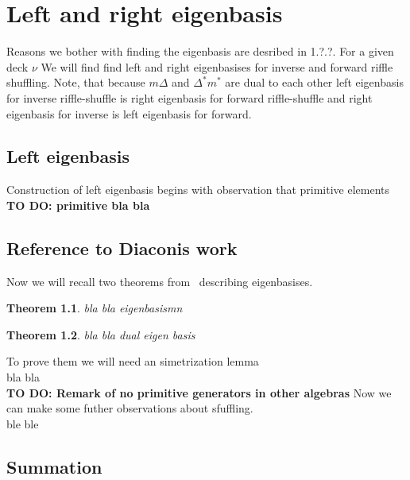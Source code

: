 \documentclass[a4paper, 12pt]{report}
\newtheorem{theorem}{Theorem}
\newcommand{\todo}[1]{\hfill \break \textbf{\Huge TO DO: #1 \hfill \break}\normalsize}
\begin{document}
\chapter{Left and right eigenbasis}

Reasons we bother with finding the eigenbasis are desribed in 1.?.?. For a given deck $\nu$ 
We will find find left and right eigenbasises for inverse and forward riffle shuffling. Note, that because 
$m\Delta$ and $\Delta^*m^*$ are dual to each other left eigenbasis for inverse riffle-shuffle is right 
eigenbasis for forward riffle-shuffle and right eigenbasis for inverse is left eigenbasis for forward.

\section{Left eigenbasis}
Construction of left eigenbasis begins with observation that primitive elements
\todo{primitive bla bla}
\section{Reference to Diaconis work}
Now we will recall two theorems from~\cite{Diaconis2014} describing eigenbasises.
\begin{theorem}
bla bla eigenbasismn   
\end{theorem}
\begin{theorem}
bla bla dual eigen basis
\end{theorem}
To prove them we will need an simetrization lemma \\
bla bla\\[8pt]
\todo{Remark of no primitive generators in other algebras}
Now we can make some futher observations about sfuffling.\\
ble ble\\

\section{Summation}


{}

\end{document}
